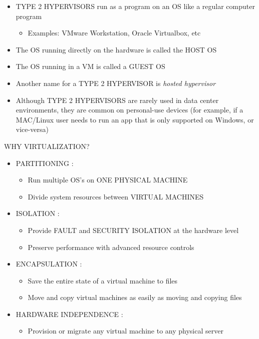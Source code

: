 \begin{itemize}
\tightlist
\item
  TYPE 2 HYPERVISORS run as a program on an OS like a regular computer
  program

  \begin{itemize}
  \tightlist
  \item
    Examples: VMware Workstation, Oracle Virtualbox, etc
  \end{itemize}
\item
  The OS running directly on the hardware is called the HOST OS
\item
  The OS running in a VM is called a GUEST OS
\item
  Another name for a TYPE 2 HYPERVISOR is \emph{hosted hypervisor}
\item
  Although TYPE 2 HYPERVISORS are rarely used in data center
  environments, they are common on personal-use devices (for example, if
  a MAC/Linux user needs to run an app that is only supported on
  Windows, or vice-versa)
\end{itemize}

WHY VIRTUALIZATION?

\begin{itemize}
\tightlist
\item
  PARTITIONING :

  \begin{itemize}
  \tightlist
  \item
    Run multiple OS's on ONE PHYSICAL MACHINE
  \item
    Divide system resources between VIRTUAL MACHINES
  \end{itemize}
\item
  ISOLATION :

  \begin{itemize}
  \tightlist
  \item
    Provide FAULT and SECURITY ISOLATION at the hardware level
  \item
    Preserve performance with advanced resource controls
  \end{itemize}
\item
  ENCAPSULATION :

  \begin{itemize}
  \tightlist
  \item
    Save the entire state of a virtual machine to files
  \item
    Move and copy virtual machines as easily as moving and copying files
  \end{itemize}
\item
  HARDWARE INDEPENDENCE :

  \begin{itemize}
  \tightlist
  \item
    Provision or migrate any virtual machine to any physical server
  \end{itemize}
\end{itemize}

